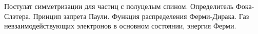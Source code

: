 \documentclass[__main__.tex]{subfiles}
\begin{document}
Постулат симметризации для частиц с полуцелым спином. Определитель Фока-Слэтера. Принцип запрета Паули. Функция распределения Ферми-Дирака. Газ невзаимодействующих электронов в основном состоянии, энергия Ферми.\\ 

\end{document}
